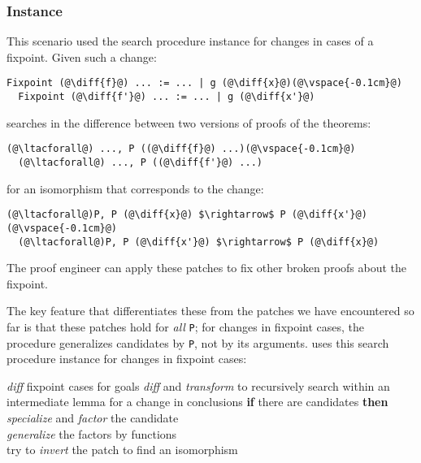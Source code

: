 \subsubsection{Instance}

This scenario used the search procedure instance for changes in cases of a fixpoint.
Given such a change:

\begin{lstlisting}[language=coq]
  Fixpoint (@\diff{f}@) ... := ... | g (@\diff{x}@)(@\vspace{-0.1cm}@)
  Fixpoint (@\diff{f'}@) ... := ... | g (@\diff{x'}@)
\end{lstlisting}
\sysname searches in the difference between two versions of proofs of the theorems:

\begin{lstlisting}[language=coq]
  (@\ltacforall@) ..., P ((@\diff{f}@) ...)(@\vspace{-0.1cm}@)
  (@\ltacforall@) ..., P ((@\diff{f'}@) ...)
\end{lstlisting}
for an isomorphism that corresponds to the change:

\begin{lstlisting}[language=coq]
  (@\ltacforall@)P, P (@\diff{x}@) $\rightarrow$ P (@\diff{x'}@)(@\vspace{-0.1cm}@)
  (@\ltacforall@)P, P (@\diff{x'}@) $\rightarrow$ P (@\diff{x}@)
\end{lstlisting}
The proof engineer can apply these patches to fix other broken proofs about the fixpoint.

The key feature that differentiates these from the patches we have encountered so far is that
these patches hold for \emph{all} \lstinline{P}; for changes in fixpoint cases, the procedure generalizes
candidates by \lstinline{P}, not by its arguments.
\sysname uses this search procedure instance for changes in fixpoint cases:

\begin{algorithm}
\footnotesize
\begin{algorithmic}[1]
    \STATE \textit{diff} fixpoint cases for goals
    \STATE \textit{diff} and \textit{transform} to recursively search within an intermediate lemma for a change in conclusions
    \STATE \textbf{if} there are candidates \textbf{then}
    \STATE \hspace*{1em} \textit{specialize} and \textit{factor} the candidate \\
           \hspace*{1em} \textit{generalize} the factors by functions \\
           \hspace*{1em} try to \textit{invert} the patch to find an isomorphism 
\end{algorithmic}
\end{algorithm}

